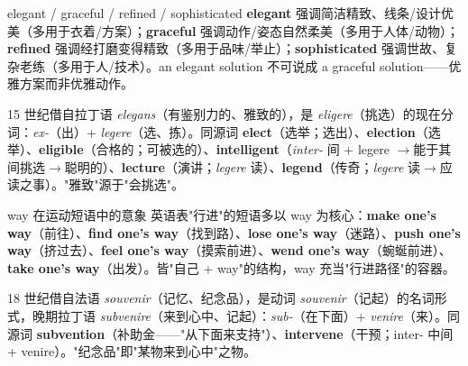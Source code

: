 \documentclass[../main.tex]{subfiles}
\begin{document}
\begin{lex}{elegant / graceful / refined / sophisticated}
\textbf{elegant} 强调简洁精致、线条/设计优美（多用于衣着/方案）；\textbf{graceful} 强调动作/姿态自然柔美（多用于人体/动物）；\textbf{refined} 强调经打磨变得精致（多用于品味/举止）；\textbf{sophisticated} 强调世故、复杂老练（多用于人/技术）。an elegant solution 不可说成 a graceful solution——优雅方案而非优雅动作。
\end{lex}

\begin{origin}
15 世纪借自拉丁语 \textit{elegans}（有鉴别力的、雅致的），是 \textit{eligere}（挑选）的现在分词：\textit{ex-}（出）+ \textit{legere}（选、拣）。同源词 \textbf{elect}（选举；选出）、\textbf{election}（选举）、\textbf{eligible}（合格的；可被选的）、\textbf{intelligent}（\textit{inter-} 间 + legere $\to$能于其间挑选$\to$聪明的）、\textbf{lecture}（演讲；\textit{legere} 读）、\textbf{legend}（传奇；\textit{legere} 读$\to$应读之事）。"雅致"源于"会挑选"。
\end{origin}



\begin{gram}{way 在运动短语中的意象}
英语表"行进"的短语多以 way 为核心：\textbf{make one's way}（前往）、\textbf{find one's way}（找到路）、\textbf{lose one's way}（迷路）、\textbf{push one's way}（挤过去）、\textbf{feel one's way}（摸索前进）、\textbf{wend one's way}（蜿蜒前进）、\textbf{take one's way}（出发）。皆"自己 + way"的结构，way 充当"行进路径"的容器。
\end{gram}



\begin{origin}
18 世纪借自法语 \textit{souvenir}（记忆、纪念品），是动词 \textit{souvenir}（记起）的名词形式，晚期拉丁语 \textit{subvenire}（来到心中、记起）：\textit{sub-}（在下面）+ \textit{venire}（来）。同源词 \textbf{subvention}（补助金——"从下面来支持"）、\textbf{intervene}（干预；inter- 中间 + venire）。"纪念品"即"某物来到心中"之物。
\end{origin}
\end{document}
